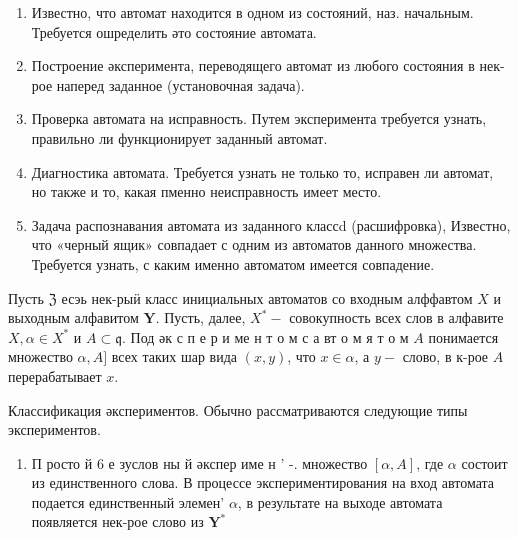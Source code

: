 \documentclass[10pt]{article}
\begin{document}
\begin{enumerate}

  \item Известно, что автомат находится в одном из состояний, наз. начальным. Требуется ошределить әто состояние автомата.



  \item Построение әксперимента, переводящего автомат из любого состояния в нек-рое наперед заданное (установочная задача).



  \item Проверка автомата на исправность. Путем эксперимента требуется узнать, правильно ли функционирует заданный автомат.



  \item Диагностика автомата. Требуется узнать не только то, исправен ли автомат, но также и то, какая пменно неисправность имеет место.



  \item Задача распознавания автомата из заданного классd (расшифровка), Известно, что «черный ящик» совпадает с одним из автоматов данного множества. Требуется узнать, с каким именно автоматом имеется совпадение.



\end{enumerate}



Пусть $\mathfrak{Z}$ есэь нек-рыӥ класс инициальных автоматов со входным алффавтом $X$ и выходным алфавитом $\boldsymbol{Y}$. Пусть, далее, $X^{*}-$ совокупность всех слов в алфавите $X, \alpha \in X^{*}$ и $A \subset \mathfrak{q}$. Под әк с п е р и ме н т о м с а вт о м я т о м $A$ понимается множество $\alpha, A]$ всех таких шар вида $(x, y)$, что $x \in \alpha$, а $y-$ слово, в к-рое $A$ перерабатывает $x$.



Классификация әкспериментов. Обычно рассматриваются следующие типы экспериментов.



\begin{enumerate}

  \item П росто й 6 е зуслов ны й әкспер име н ' -. множество $[\alpha, A]$, где $\alpha$ состоит из единственного слова. В процессе экспериментирования на вход автомата подается единственный элемен' $\alpha$, в результате на выходе автомата появляется нек-рое слово из $\boldsymbol{Y}^{*}$

\end{enumerate}
\end{document}
